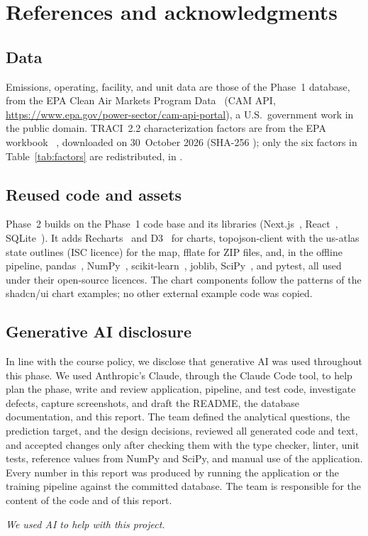 \documentclass[11pt,a4paper]{article}
\begin{document}
\section{References and acknowledgments}
\label{sec:references}

\subsection{Data}

Emissions, operating, facility, and unit data are those of the Phase~1 database, from the EPA
Clean Air Markets Program Data~\cite{epa2026campd} (CAM API,
\url{https://www.epa.gov/power-sector/cam-api-portal}), a U.S.\ government work in the public
domain. TRACI~2.2 characterization factors are from the
EPA workbook ~\cite{epa2022traci22}, downloaded on 30~October 2026
(SHA-256 ); only the six factors in Table~\ref{tab:factors} are
redistributed, in .

\subsection{Reused code and assets}

Phase~2 builds on the Phase~1 code base and its libraries (Next.js~\cite{nextjs},
React~\cite{react}, SQLite~\cite{gaffney2022sqlite}). It adds Recharts~\cite{recharts} and
D3~\cite{bostock2011d3} for charts, topojson-client with the us-atlas state outlines (ISC
licence) for the map, fflate for ZIP files, and, in the offline pipeline,
pandas~\cite{mckinney2010pandas}, NumPy~\cite{harris2020numpy},
scikit-learn~\cite{pedregosa2011sklearn}, joblib, SciPy~\cite{virtanen2020scipy}, and pytest, all
used under their open-source licences. The chart components follow the patterns of the shadcn/ui
chart examples; no other external example code was copied.

\subsection{Generative AI disclosure}

In line with the course policy, we disclose that generative AI was used throughout this phase.
We used Anthropic's Claude, through the Claude Code tool, to help plan the phase, write and
review application, pipeline, and test code, investigate defects, capture screenshots, and draft
the README, the database documentation, and this report. The team defined the analytical
questions, the prediction target, and the design decisions, reviewed all generated code and
text, and accepted changes only after checking them with the type checker, linter, unit tests,
reference values from NumPy and SciPy, and manual use of the application. Every number in this
report was produced by running the application or the training pipeline against the committed
database. The team is responsible for the content of the code and of this report.

\renewcommand{\refname}{Bibliography}



\vfill
\noindent\textit{We used AI to help with this project.}
\end{document}
